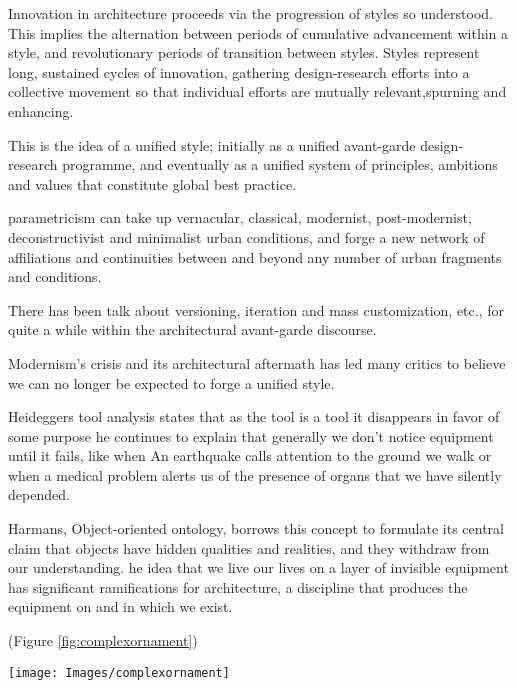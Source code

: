 Innovation in architecture proceeds via the progression of styles so understood.
This implies the alternation between periods of cumulative advancement within a style, and revolutionary periods of transition between styles.
Styles represent long, sustained cycles of innovation, gathering design-research efforts into a collective movement so that individual efforts are mutually relevant,spurning and enhancing.\cite{Schumacher2010}


This is the idea of a unified style;
initially as a unified avant-garde design-research programme, and eventually as a unified system of principles, ambitions and values that constitute global best practice.\cite{Schumacher2010}


parametricism can take up vernacular, classical, modernist, post-modernist, deconstructivist and minimalist urban conditions, and forge a new network of affiliations and continuities between and beyond any number of urban fragments and conditions. \cite{Schumacher2010}


There has been talk about versioning, iteration and mass customization, etc., for quite a while within the architectural avant-garde discourse. \cite{Schumacher2008}


Modernism’s crisis and its architectural aftermath has led many critics to believe we can no longer be expected to forge a unified style.\cite{Schumacher2010}


Heideggers tool analysis states that as the tool is a tool it disappears in favor of some purpose he continues to explain that generally we don't notice equipment until it fails, like when An earthquake calls attention to the ground we walk or when a medical problem alerts us of the presence of organs that we have silently depended\cite{Harman2011}.

Harmans, Object-oriented ontology, borrows this concept to formulate its central claim that objects have hidden qualities and realities, and they withdraw from our understanding.\cite{Gage2015}
he idea that we live our lives on a layer of invisible equipment has significant ramifications for architecture, a discipline that produces the equipment on and in which we exist.\cite{Gage2015}

(Figure \ref{fig:complexornament})

     \begin{figure*}[htb]
          \centering
          \texttt{[image: Images/complexornament]}
          \caption{Complex ornament reference  (\textit{Images edited from source)}}
          \label{fig:complexornament}
        \end{figure*}
